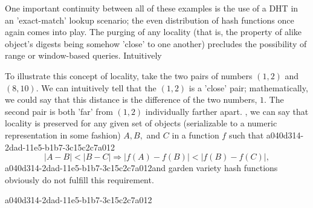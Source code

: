 \documentclass[12pt]{article}
\begin{document}
\par One important continuity between all of these examples is the use of a DHT in an 'exact-match' lookup scenario; the even distribution of hash functions once again comes into play. The purging of any locality (that is, the property of alike object's digests being somehow 'close' to one another) precludes the possibility of range or window-based queries. Intuitively

\par To illustrate this concept of locality, take the two pairs of numbers $(1,2)$ and $(8,10)$. We can intuitively tell that the $(1,2)$ is a 'close' pair; mathematically, we could say that this distance is the difference of the two numbers, $1$. The second pair is both 'far' from $(1,2)$ individually farther apart. , we can say that locality is preserved for any given set of objects (serializable to a numeric representation in some fashion) $A,B,$ and $C$ in a function $f$ such that
a040d314-2dad-11e5-b1b7-3c15c2c7a012\begin{equation}
|A-B| < |B-C| \Rightarrow |f(A)-f(B)| < |f(B) - f(C)|,
\end{equation}
a040d314-2dad-11e5-b1b7-3c15c2c7a012and garden variety hash functions obviously do not fulfill this requirement.

a040d314-2dad-11e5-b1b7-3c15c2c7a012\printbibliography
\end{document}
